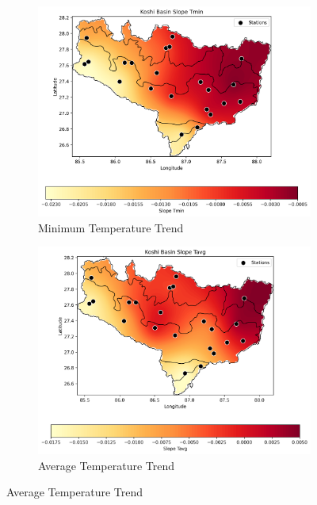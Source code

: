 \begin{figure}[htbp]
  \centering
  \begin{subfigure}{0.45\textwidth}
      \centering
      \includegraphics[width=\linewidth]{images/avg_krig_Koshi Basin Slope Tmin.png}
      \caption{Minimum Temperature Trend}
      \label{fig:basin_min_trend}
  \end{subfigure}
  \hfill
  \begin{subfigure}{0.45\textwidth}
      \centering
      \includegraphics[width=\linewidth]{images/avg_krig_Koshi Basin Slope Tavg.png}
      \caption{Average Temperature Trend}
      \label{fig:basin_avg_trend}
  \end{subfigure}
  

\end{figure}
